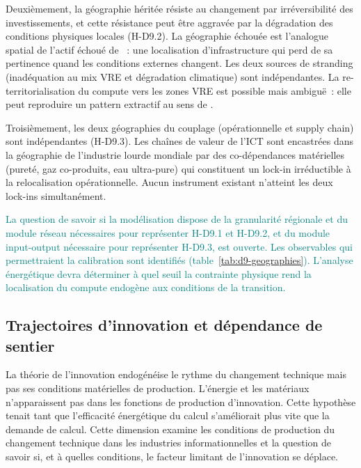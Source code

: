 Deuxièmement, la géographie héritée résiste au changement par irréversibilité des investissements, et cette résistance peut être aggravée par la dégradation des conditions physiques locales (H-D9.2). La géographie échouée est l'analogue spatial de l'actif échoué de \textcite{mcglade_geographical_2015}~: une localisation d'infrastructure qui perd de sa pertinence quand les conditions externes changent. Les deux sources de stranding (inadéquation au mix VRE et dégradation climatique) sont indépendantes. La re-territorialisation du compute vers les zones VRE est possible mais ambiguë~: elle peut reproduire un pattern extractif au sens de \textcite{rodriguez_pose_revenge_2018}.

Troisièmement, les deux géographies du couplage (opérationnelle et supply chain) sont indépendantes (H-D9.3). Les chaînes de valeur de l'ICT sont encastrées dans la géographie de l'industrie lourde mondiale par des co-dépendances matérielles (pureté, gaz co-produits, eau ultra-pure) qui constituent un lock-in irréductible à la relocalisation opérationnelle. Aucun instrument existant n'atteint les deux lock-ins simultanément.

\textcolor{teal}{La question de savoir si la modélisation dispose de la granularité régionale et du module réseau nécessaires pour représenter H-D9.1 et H-D9.2, et du module input-output nécessaire pour représenter H-D9.3, est ouverte. Les observables qui permettraient la calibration sont identifiés (table~\ref{tab:d9-geographies}). L'analyse énergétique devra déterminer à quel seuil la contrainte physique rend la localisation du compute endogène aux conditions de la transition.}

\clearpage
\subsection{Trajectoires d'innovation et dépendance de sentier}\label{sec:d10-innovation}

La théorie de l'innovation endogénéise le rythme du changement technique mais pas ses conditions matérielles de production. L'énergie et les matériaux n'apparaissent pas dans les fonctions de production d'innovation. Cette hypothèse tenait tant que l'efficacité énergétique du calcul s'améliorait plus vite que la demande de calcul. Cette dimension examine les conditions de production du changement technique dans les industries informationnelles et la question de savoir si, et à quelles conditions, le facteur limitant de l'innovation se déplace.

